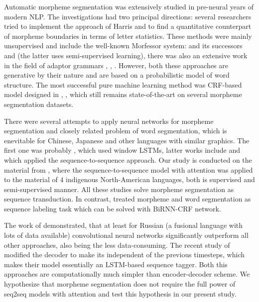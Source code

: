 \documentclass[11pt,a4paper]{article}
\begin{document}
Automatic morpheme segmentation was extensively studied in pre-neural years of modern NLP. The investigations had two principal directions: several researchers tried to implement the approach of Harris  and  to find a quantitative counterpart of morpheme boundaries in terms of letter statistics. These methods were mainly unsupervised and include the well-known Morfessor system:  and its successors  and  (the latter uses semi-supervised learning), there was also an extensive work in the field of adaptor grammars , , . However, both these approaches are generative by their nature and are based on a probabilistic model of word structure. The most successful pure machine learning method was CRF-based model designed in , , which still remains state-of-the-art on several morpheme segmentation datasets.

There were several attempts to apply neural networks for morpheme segmentation and closely related problem of word segmentation, which is enevitable for Chinese, Japanese and other languages with similar graphics. The first one was probably , which used window LSTMs, latter works include  and  which applied the sequence-to-sequence approach. Our study is conducted on the material from , where the sequence-to-sequence model with attention was applied to the material of $4$ indigenous North-American languages, both is supervised and semi-supervised manner. All these studies solve morpheme segmentation as sequence transduction. In contrast,  treated morpheme and word segmentation as sequence labeling task which can be solved with BiRNN-CRF network. 

The work of  demonstrated, that at least for Russian (a fusional language with lots of data available) convolutional neural networks significantly outperform all other approaches, also being the less data-consuming. The recent study of  modified the decoder to make its independent of the previous timesteps, which makes their model essentially an LSTM-based sequence tagger. Both this approaches are computationally much simpler than encoder-decoder scheme. We hypothesize that morpheme segmentation does not require the full power of seq2seq models with attention and test this hypothesis in our present study.
\end{document}
